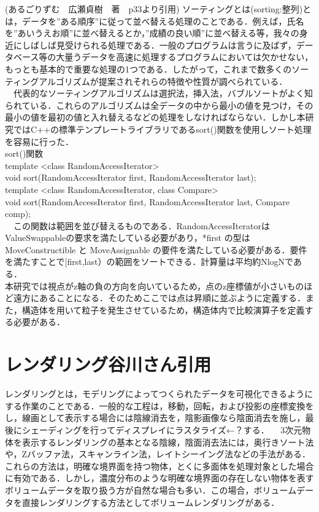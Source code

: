 \documentclass[11pt]{jreport}
\begin{document}
(あるごりずむ　広瀬貞樹　著　p33より引用)
ソーティングとは(sorting:整列)とは，データを”ある順序”に従って並べ替える処理のことである．例えば，氏名を”あいうえお順”に並べ替えるとか，”成績の良い順”に並べ替える等，我々の身近にしばしば見受けられる処理である．一般のプログラムは言うに及ばず，データベース等の大量うデータを高速に処理するプログラムにおいては欠かせない，もっとも基本的で重要な処理の1つである．したがって，これまで数多くのソーティングアルゴリズムが提案されそれらの特徴や性質が調べられている．\\
　代表的なソーティングアルゴリズムは選択法，挿入法，バブルソートがよく知られている．これらのアルゴリズムは全データの中から最小の値を見つけ，その最小の値を最初の値と入れ替えるなどの処理をしなければならない．しかし本研究ではC++の標準テンプレートライブラリであるsort()関数を使用しソート処理を容易に行った．\\
sort()関数\\
  template <class RandomAccessIterator>\\
  void sort(RandomAccessIterator first, RandomAccessIterator last);\\
  template <class RandomAccessIterator, class Compare>\\
  void sort(RandomAccessIterator first, RandomAccessIterator last, Compare comp);\\
　この関数は範囲を並び替えるものである．RandomAccessIteratorはValueSwappableの要求を満たしている必要があり，*first の型は MoveConstructible と MoveAssignable の要件を満たしている必要がある．要件を満たすことで[first,last）の範囲をソートできる．計算量は平均約NlogNである．\\
本研究では視点がz軸の負の方向を向いているため，点のz座標値が小さいものほど遠方にあることになる．そのためここでは点は昇順に並ぶように定義する．また，構造体を用いて粒子を発生させているため，構造体内で比較演算子を定義する必要がある．

\section{レンダリング谷川さん引用}
レンダリングとは，モデリングによってつくられたデータを可視化できるようにする作業のことである．一般的な工程は，移動，回転，および投影の座標変換をし，線画として表示する場合には陰線消去を，陰影画像なら陰面消去を施し，最後にシェーディングを行ってディスプレイにラスタライズ←？する．
　3次元物体を表示するレンダリングの基本となる陰線，陰面消去法には，奥行きソート法や，Zバッファ法，スキャンライン法，レイトシーイング法などの手法がある．これらの方法は，明確な境界面を持つ物体，とくに多面体を処理対象とした場合に有効である．しかし，濃度分布のような明確な境界面の存在しない物体を表すボリュームデータを取り扱う方が自然な場合も多い．この場合，ボリュームデータを直接レンダリングする方法としてボリュームレンダリングがある．
\end{document}
